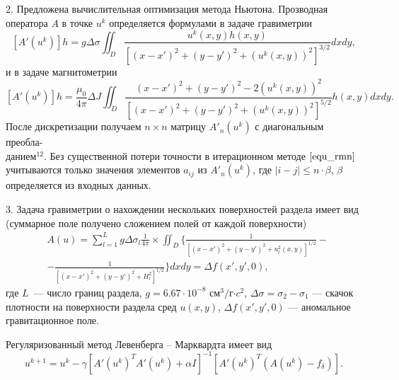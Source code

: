 \documentclass[%
autoref,     %
href,        %
colorlinks,  %
]{disser}
\begin{document}
2. Предложена вычислительная оптимизация метода Ньютона. Прозводная оператора $A$ в точке $u^k$ определяется формулами в задаче гравиметрии
$$ [A'(u^k)]h=g\Delta\sigma\iint_{D} \frac{u^k(x,y)h(x,y)}{[(x-x')^2+(y-y')^2+(u^k(x,y))^2]^{3/2}}dxdy,$$
и в задаче магнитометрии
$$ [A'(u^k)]h=\frac{\mu_0}{4\pi}\Delta J\iint_{D} \frac{(x-x')^2+(y-y')^2-2(u^k(x,y))^2}{[(x-x')^2+(y-y')^2+(u^k(x,y))^2]^{5/2}}h(x,y) dxdy.$$
После дискретизации получаем $n\times n$ матрицу $A'_n(u^k)$ с диагональным преобла-\\данием$^{12}$. Без существенной потери точности в итерационном методе $\eqref{equ_rmn}$ учитываются только значения элементов $a_{ij}$ из $A'_n(u^k)$, где $|i-j|\leqslant n\cdot\beta$, $\beta$ определяется из входных данных.
{\scriptsize
	\let\thefootnote\relax\let\thefootnote\relax{}
	}

3. Задача гравиметрии о нахождении нескольких поверхностей раздела имеет вид (суммарное поле получено сложением полей от каждой поверхности)
\begin{equation}\label{equ_grav_multi}
		\begin{aligned}
		& A(u)=\sum_{l=1}^{L}g\Delta\sigma_l\frac{1}{4\pi}\times 
		\iint_D\bigg\{\frac{1}{[(x-x')^2+(y-y')^2+u_l^2(x,y)]^{1/2}} - \\
		&-\frac{1}{[(x-x')^2+(y-y')^2+H_l^2]^{1/2}}\bigg\}dxdy=\Delta f(x',y',0),
		\end{aligned}
\end{equation}		
где $L$~--- число границ раздела, $g=6.67\cdot10^{-8}$ см$^3/$г$\cdot c^2$, $\Delta\sigma=\sigma_2-\sigma_1$ --- скачок плотности на поверхности раздела сред $u(x,y)$, $\Delta f(x',y',0)$ --- аномальное гравитационное поле.

Регуляризованный метод Левенберга -- Марквардта имеет вид 
$$u^{k+1}=u^k-\gamma[A'(u^k)^T A'(u^k)+\alpha I]^{-1} [A'(u^k)^T(A(u^k)-f_\delta)].$$
\end{document}
